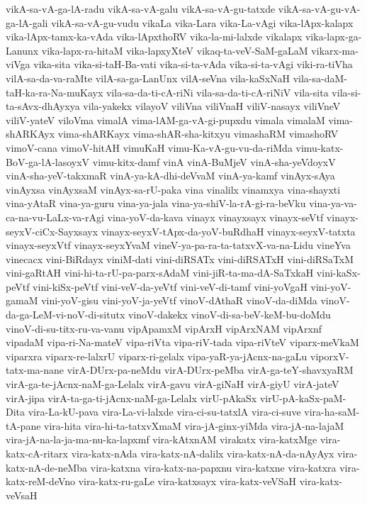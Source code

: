 {vikA-sa-vA-ga-lA-radu
vikA-sa-vA-galu
vikA-sa-vA-gu-tatxde
vikA-sa-vA-gu-vA-ga-lA-gali
vikA-sa-vA-gu-vudu
vikaLa
vika-Lara
vika-La-vAgi
vika-lApx-kalapx
vika-lApx-tamx-ka-vAda
vika-lApxthoRV
vika-la-mi-lalxde
vikalapx
vika-lapx-ga-Lanunx
vika-lapx-ra-hitaM
vika-lapxyXteV
vikaq-ta-veV-SaM-gaLaM
vikarx-ma-viVga
vika-sita
vika-si-taH-Ba-vati
vika-si-ta-vAda
vika-si-ta-vAgi
viki-ra-tiVha
vilA-sa-da-va-raMte
vilA-sa-ga-LanUnx
vilA-seVna
vila-kaSxNaH
vila-sa-daM-taH-ka-ra-Na-muKayx
vila-sa-da-ti-cA-riNi
vila-sa-da-ti-cA-riNiV
vila-sita
vila-si-ta-sAvx-dhAyxya
vila-yakekx
vilayoV
viliVna
viliVnaH
viliV-nasayx
viliVneV
viliV-yateV
viloVma
vimalA
vima-lAM-ga-vA-gi-pupxdu
vimala
vimalaM
vima-shARKAyx
vima-shARKayx
vima-shAR-sha-kitxyu
vimashaRM
vimashoRV
vimoV-cana
vimoV-hitAH
vimuKaH
vimu-Ka-vA-gu-vu-da-riMda
vimu-katx-BoV-ga-lA-lasoyxV
vimu-kitx-damf
vinA
vinA-BuMjeV
vinA-sha-yeVdoyxV
vinA-sha-yeV-takxmaR
vinA-ya-kA-dhi-deVvaM
vinA-ya-kamf
vinAyx-sAya
vinAyxsa
vinAyxsaM
vinAyx-sa-rU-paka
vina
vinalilx
vinamxya
vina-shayxti
vina-yAtaR
vina-ya-guru
vina-ya-jala
vina-ya-shiV-la-rA-gi-ra-beVku
vina-ya-va-ca-na-vu-LaLx-va-rAgi
vina-yoV-da-kava
vinayx
vinayxsayx
vinayx-seVtf
vinayx-seyxV-ciCx-Sayxsayx
vinayx-seyxV-tApx-da-yoV-buRdhaH
vinayx-seyxV-tatxta
vinayx-seyxVtf
vinayx-seyxYvaM
vineV-ya-pa-ra-ta-tatxvX-va-na-Lidu
vineYva
vinecacx
vini-BiRdayx
viniM-dati
vini-diRSATx
vini-diRSATxH
vini-diRSaTxM
vini-gaRtAH
vini-hi-ta-rU-pa-parx-sAdaM
vini-jiR-ta-ma-dA-SaTxkaH
vini-kaSx-peVtf
vini-kiSx-peVtf
vini-veV-da-yeVtf
vini-veV-di-tamf
vini-yoVgaH
vini-yoV-gamaM
vini-yoV-gisu
vini-yoV-ja-yeVtf
vinoV-dAthaR
vinoV-da-diMda
vinoV-da-ga-LeM-vi-noV-di-situtx
vinoV-dakekx
vinoV-di-sa-beV-keM-bu-doMdu
vinoV-di-su-titx-ru-va-vanu
vipApamxM
vipArxH
vipArxNAM
vipArxnf
vipadaM
vipa-ri-Na-mateV
vipa-riVta
vipa-riV-tada
vipa-riVteV
viparx-meVkaM
viparxra
viparx-re-lalxrU
viparx-ri-gelalx
vipa-yaR-ya-jAcnx-na-gaLu
viporxV-tatx-ma-nane
virA-DUrx-pa-neMdu
virA-DUrx-peMba
virA-ga-teY-shavxyaRM
virA-ga-te-jAcnx-naM-ga-Lelalx
virA-gavu
virA-giNaH
virA-giyU
virA-jateV
virA-jipa
virA-ta-ga-ti-jAcnx-naM-ga-Lelalx
virU-pAkaSx
virU-pA-kaSx-paM-Dita
vira-La-kU-pava
vira-La-vi-lalxde
vira-ci-su-tatxlA
vira-ci-suve
vira-ha-saM-tA-pane
vira-hita
vira-hi-ta-tatxvXmaM
vira-jA-ginx-yiMda
vira-jA-na-lajaM
vira-jA-na-la-ja-ma-nu-ka-lapxmf
vira-kAtxnAM
virakatx
vira-katxMge
vira-katx-cA-ritarx
vira-katx-nAda
vira-katx-nA-dalilx
vira-katx-nA-da-nAyAyx
vira-katx-nA-de-neMba
vira-katxna
vira-katx-na-papxnu
vira-katxne
vira-katxra
vira-katx-reM-deVno
vira-katx-ru-gaLe
vira-katxsayx
vira-katx-veVSaH
vira-katx-veVsaH
}
